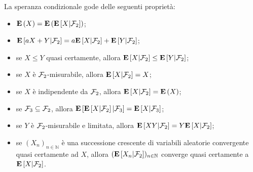 \begin{Theorem}
	La speranza condizionale gode delle seguenti propriet\`a:
	\begin{itemize}
		\item $\mathbf{E} \left ( X \right ) = \mathbf{E} \left ( \mathbf{E} \left [X|\mathcal{F}_2 \right ] \right )$;
		\item $\mathbf{E} \left [aX+Y|\mathcal{F}_2 \right ] = a\mathbf{E} \left [X|\mathcal{F}_2 \right ] + \mathbf{E} \left [Y|\mathcal{F}_2 \right ]$;
		\item se $X \leq Y$ quasi certamente, allora $\mathbf{E} \left [X|\mathcal{F}_2 \right ] \leq \mathbf{E} \left [Y|\mathcal{F}_2 \right ]$;
		\item se $X$ \`e $\mathcal{F}_2$-misurabile, allora $\mathbf{E} \left [X|\mathcal{F}_2 \right ] = X$;
		\item se $X$ \`e indipendente da $\mathcal{F}_2$, allora $\mathbf{E} \left [X|\mathcal{F}_2 \right ] = \mathbf{E} \left ( X \right )$;
		\item se $\mathcal{F}_3 \subseteq \mathcal{F}_2$, allora $\mathbf{E} \left [\mathbf{E} \left [X|\mathcal{F}_2 \right ]|\mathcal{F}_3 \right ] = \mathbf{E} \left [X|\mathcal{F}_3 \right ]$;
		\item se $Y$ \`e $\mathcal{F}_2$-misurabile e limitata, allora $\mathbf{E} \left [XY|\mathcal{F}_2 \right ] = Y\mathbf{E} \left [X|\mathcal{F}_2 \right ]$;
		\item se $(X_n)_{n \in \mathbb{N}}$ \`e una successione crescente di variabili aleatorie convergente quasi certamente ad $X$, allora $(\mathbf{E} \left [X_n|\mathcal{F}_2 \right ])_{n \in \mathbb{N}}$ converge quasi certamente a $\mathbf{E} \left [X|\mathcal{F}_2 \right ]$.
	\end{itemize}
\end{Theorem}
